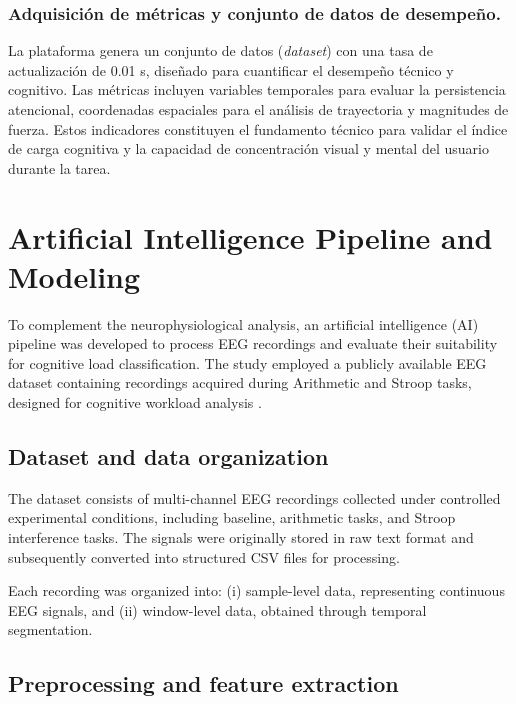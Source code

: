 \documentclass[10pt]{iopart}
\begin{document}
\subsubsection{Adquisición de métricas y conjunto de datos de desempeño.}

La plataforma genera un conjunto de datos (\textit{dataset}) con una tasa de actualización de 0.01 s, diseñado para cuantificar el desempeño técnico y cognitivo. Las métricas incluyen variables temporales para evaluar la persistencia atencional, coordenadas espaciales para el análisis de trayectoria y magnitudes de fuerza. Estos indicadores constituyen el fundamento técnico para validar el índice de carga cognitiva y la capacidad de concentración visual y mental del usuario durante la tarea.


\section{Artificial Intelligence Pipeline and Modeling}

To complement the neurophysiological analysis, an artificial intelligence (AI) pipeline was developed to process EEG recordings and evaluate their suitability for cognitive load classification. The study employed a publicly available EEG dataset containing recordings acquired during Arithmetic and Stroop tasks, designed for cognitive workload analysis \cite{Nirabi2025_EEGDataset}.

\subsection{Dataset and data organization}

The dataset consists of multi-channel EEG recordings collected under controlled experimental conditions, including baseline, arithmetic tasks, and Stroop interference tasks. The signals were originally stored in raw text format and subsequently converted into structured CSV files for processing.

Each recording was organized into:
(i) sample-level data, representing continuous EEG signals, and  
(ii) window-level data, obtained through temporal segmentation.

\subsection{Preprocessing and feature extraction}
\end{document}
